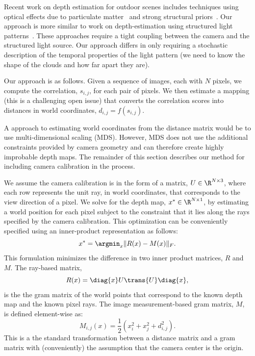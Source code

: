 Recent work on depth estimation for outdoor scenes includes techniques
using optical effects due to particulate
matter~\cite{contrastRestoration, novelDepth2009} and strong
structural priors~\cite{closingTheLoop}. Our approach is more similar
to work on depth-estimation using structured light
patterns~\cite{VaqueroCVPR2009}.  These approaches require a tight
coupling between the camera and the structured light source.  Our
approach differs in only requiring a stochastic description of the
temporal properties of the light pattern (\ie we need to know the
shape of the clouds and how far apart they are). 

Our approach is as follows.  Given a sequence of images, each with $N$
pixels, we compute the correlation, $s_{i,j}$, for each pair of
pixels. We then estimate a mapping (this is a challenging open issue)
that converts the correlation scores into distances in world
coordinates, $d_{i,j} = f(s_{i,j})$. 

A \naive approach to estimating world coordinates from the distance
matrix would be to use multi-dimensional scaling (MDS).  However, MDS
does not use the additional constraints provided by camera geometry
and can therefore create highly improbable depth maps. The remainder
of this section describes our method for including camera calibration
in the process.

We assume the camera calibration is in the form of a matrix, $U \in
\R^{N \times 3}$, where each row represents the unit ray, in world
coordinates, that corresponds to the view direction of a pixel.  We solve for the depth map,
$x^*\in\R^{N\times1}$, by estimating a world position for each pixel
subject to the constraint that it lies along the rays specified by the
camera calibration.  This optimization can be conveniently specified
using an inner-product representation as follows:
\begin{equation}
  x^* = \argmin_x \| R(x)  - M(x) \|_F.
\end{equation}
This formulation minimizes the difference in two inner product
matrices, $R$ and $M$. The ray-based matrix,
\begin{equation}
  R(x) = \diag{x}U\trans{U}\diag{x},
\end{equation}
is the the gram matrix of the world points that correspond to the
known depth map and the known pixel rays.  The image measurement-based
gram matrix, $M$, is defined element-wise as:
\begin{equation}
  M_{i,j}(x) = \frac{1}{2}\left( x_i^2 + x_j^2 + d_{i,j}^2 \right).
\end{equation}
This is a the standard transformation between a distance matrix and a
gram matrix with (conveniently) the assumption that the camera center
is the origin.

